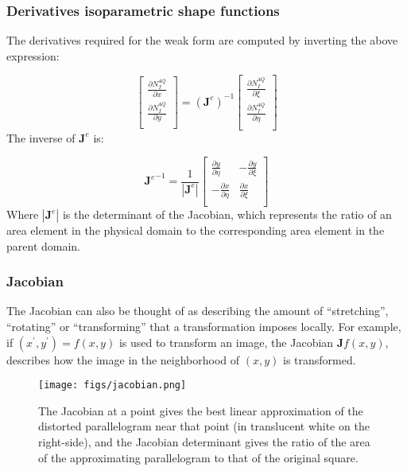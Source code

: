 \documentclass[notes]{beamer}
\begin{document}
\begin{frame}
\frametitle{Derivatives isoparametric shape functions}
The derivatives required for the weak form are computed by
inverting the above expression:

\begin{equation*}
	\begin{bmatrix}
		\frac{\partial N_I^{4Q}}{\partial x} \\
		\frac{\partial N_I^{4Q}}{\partial y} \\
	\end{bmatrix}
	= %
	(\mathbf{J}^e)^{-1}
	\begin{bmatrix}
	\frac{\partial N_I^{4Q}}{\partial \xi} \\
	\frac{\partial N_I^{4Q}}{\partial \eta} \\
	\end{bmatrix}
\end{equation*}
The inverse of $\mathbf{J}^e$ is:

\begin{equation*}
	{\mathbf{J}^e}^{-1}
	= \frac{1}{\left| \mathbf{J}^e\right|}
	\begin{bmatrix}
		\frac{\partial y}{\partial \eta} & -\frac{\partial y}{\partial \xi} \\
		-\frac{\partial x}{\partial \eta} & \frac{\partial x}{\partial \xi} \\
	\end{bmatrix}
\end{equation*}
Where $\left|\mathbf{J}^e\right|$ is the determinant of the Jacobian, which represents the ratio of an area element in the physical domain to the corresponding area element in the parent domain.
\end{frame}


\begin{frame}
	\frametitle{Jacobian}
	The Jacobian can also be thought of as describing the amount of ``stretching'', ``rotating'' or ``transforming'' that a transformation imposes locally. For example, if $(x^\prime, y^\prime) = f(x, y)$ is used to transform an image, the Jacobian $\mathbf{J} f(x, y)$, describes how the image in the neighborhood of $(x, y)$ is transformed.
	
	\begin{figure}[ht]
		\centering
		\texttt{[image: figs/jacobian.png]}
		\caption*{The Jacobian at a point gives the best linear approximation of the distorted parallelogram near that point (in translucent white on the right-side), and the Jacobian determinant gives the ratio of the area of the approximating parallelogram to that of the original square.}
	\end{figure}
\end{frame}
\end{document}
